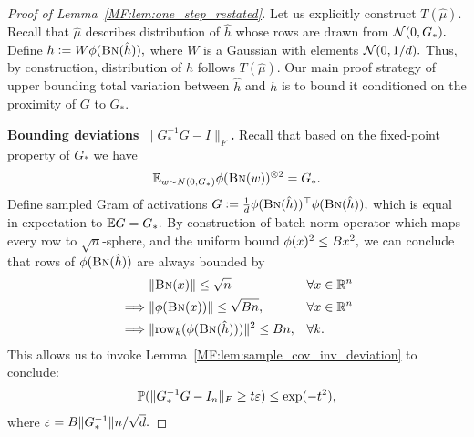 \begin{proof}[Proof of Lemma~\ref{MF:lem:one_step_restated}]
Let us explicitly construct $T(\hat \mu).$ Recall that $\hat\mu$ describes distribution of $\hat h$ whose rows are drawn \iid from $\mathcal{N}(0,G_*).$ Define $h:=W \phi(\text{\sc{Bn}}(\hat h)),$ where $W$ is a Gaussian with \iid elements $\mathcal{N}(0,1/d).$ Thus, by construction, distribution of $h$ follows $T(\hat \mu).$ Our main proof strategy of upper bounding total variation between $\hat h$ and $h$ is to bound it conditioned on the proximity of $G$ to $G_*.$ 

\textbf{Bounding deviations $\|G_*^{-1} G - I\|_F$.}
Recall that based on the fixed-point property of $G_*$ we have 
\begin{align}
    \mathbb{E}_{w\sim N(0,G_*)} \phi(\text{\sc{Bn}}(w))^{\otimes 2} = G_*.
\end{align}
Define sampled Gram of activations $G:= \frac1d \phi(\text{\sc{Bn}}(\hat h))^\top \phi(\text{\sc{Bn}}(\hat h)),$ which is equal in expectation to $\mathbb{E} G = G_*.$ By construction of batch norm operator which maps every row to $\sqrt{n}$-sphere, and the uniform bound $\phi(x) ^ 2 \le B x^2, $ we can conclude that rows of $\phi(\text{\sc{Bn}}(\hat h))$ are always bounded by 
\begin{align}
    &\|\text{\sc{Bn}}(x)\| \le \sqrt{n} && \forall x\in\mathbb{R}^n\\
  \implies  &\|\phi(\text{\sc{Bn}}(x))\| \le \sqrt{B n }, && \forall x\in\mathbb{R}^n\\
  \implies  &\|{\mathrm{row}}_k(\phi(\text{\sc{Bn}}(\hat h)))\|^2 \le B n, && \forall k.
\end{align}
This allows us to invoke Lemma~\ref{MF:lem:sample_cov_inv_deviation} to conclude:
\begin{align}
    \mathbb{P}(\|G_*^{-1} G - I_n\|_F \ge t{\varepsilon} ) \le \exp(-t^2),
\end{align}
where ${\varepsilon} = B \|G_*^{-1}\| n/\sqrt{d}.$ 



\end{proof}
